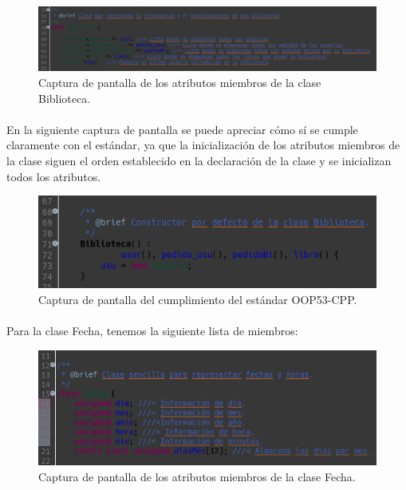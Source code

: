 			\begin{figure}[H]
				\centering
				\includegraphics[scale=0.45]{img/captura5.png}
				\caption{Captura de pantalla de los atributos miembros de la clase Biblioteca.}
				\label{captura5}
			\end{figure}
		
			\paragraph{}En la siguiente captura de pantalla se puede apreciar cómo sí se cumple claramente con el estándar, ya que la inicialización de los atributos miembros de la clase siguen el orden establecido en la declaración  de la clase y se inicializan todos los atributos.
			
			\begin{figure}[H]
				\centering
				\includegraphics[scale=0.7]{img/captura6.png}
				\caption{Captura de pantalla del cumplimiento del estándar OOP53-CPP.}
				\label{captura6}
			\end{figure}
		
			\paragraph{}Para la clase Fecha, tenemos la siguiente lista de miembros:
			
			\begin{figure}[H]
				\centering
				\includegraphics[scale=0.7]{img/captura7.png}
				\caption{Captura de pantalla de los atributos miembros de la clase Fecha.}
				\label{captura7}
			\end{figure}
		
